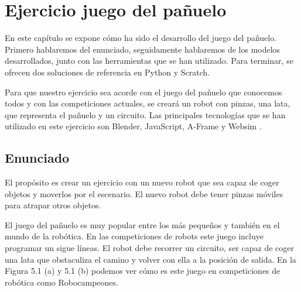 \chapter{Ejercicio juego del pañuelo} \label{gripper}
En este capítulo se expone cómo ha sido el desarrollo del juego del pañuelo. Primero hablaremos del enunciado, seguidamente hablaremos de los modelos desarrollados, junto con las herramientas que se han utilizado. Para terminar, se ofrecen dos soluciones de referencia en Python y Scratch.

Para que nuestro ejercicio sea acorde con el juego del pañuelo que conocemos todos y con las competiciones actuales, se creará un robot con pinzas, una lata, que representa el pañuelo y un circuito. Las principales tecnologías que se han utilizado en este ejercicio son Blender, JavaScript, A-Frame y Websim .


\section{Enunciado}
El propósito es crear un ejercicio con un nuevo robot que sea capaz de coger objetos y moverlos por el escenario. El nuevo robot debe tener pinzas móviles para atrapar otros objetos. 

El juego del pañuelo es muy popular entre los más pequeños y también en el mundo de la robótica. En las competiciones de robots este juego incluye programar un sigue líneas. El robot debe recorrer un circuito, ser capaz de coger una lata que obstaculiza el camino y volver con ella a la posición de salida. En la Figura 5.1 (a) y 5.1 (b) podemos ver cómo es este juego en competiciones de robótica como Robocampeones.

